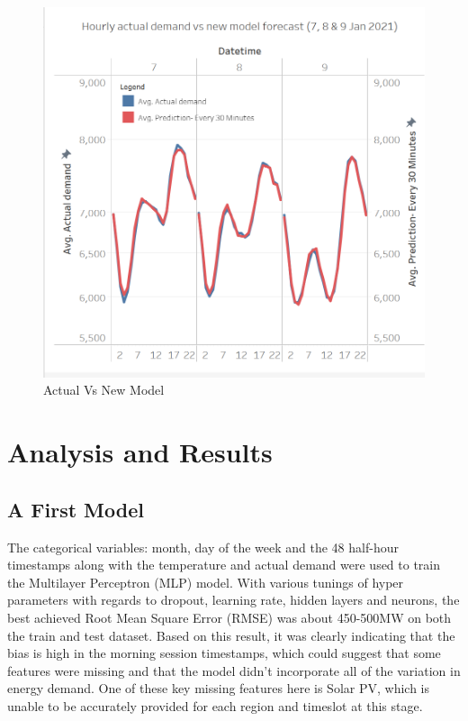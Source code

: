 \documentclass[mstat,12pt]{unswthesis}
\begin{document}
\begin{figure}[H]
\includegraphics{snapshots1/Actual Vs New Model.png}
\caption{Actual Vs New Model}\label{4.9}
\end{figure}

\hypertarget{analysis-and-results}{%
\chapter{Analysis and Results}\label{analysis-and-results}}

\hypertarget{a-first-model}{%
\section{A First Model}\label{a-first-model}}

The categorical variables: month, day of the week and the 48 half-hour
timestamps along with the temperature and actual demand were used to
train the Multilayer Perceptron (MLP) model. With various tunings of
hyper parameters with regards to dropout, learning rate, hidden layers
and neurons, the best achieved Root Mean Square Error (RMSE) was about
450-500MW on both the train and test dataset. Based on this result, it
was clearly indicating that the bias is high in the morning session
timestamps, which could suggest that some features were missing and that
the model didn't incorporate all of the variation in energy demand. One
of these key missing features here is Solar PV, which is unable to be
accurately provided for each region and timeslot at this stage.
\end{document}
